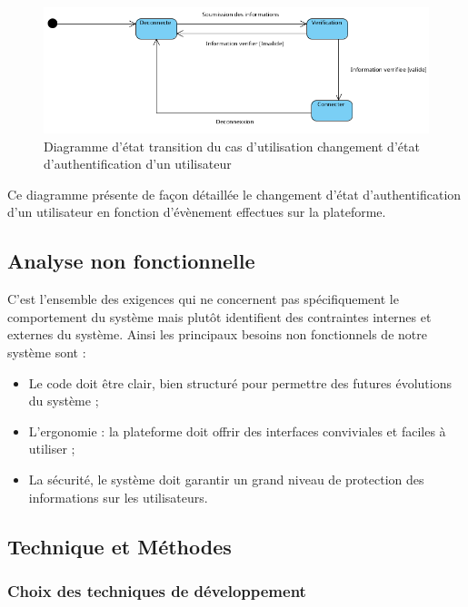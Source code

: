 \begin{itemize}
	      \begin{figure}[H]
		      \centering
		      \includegraphics[width=1\textwidth]{img/etu}
		      \caption{Diagramme d’état transition du cas d'utilisation changement d’état d'authentification d’un utilisateur}
		      \label{fig:mesh1}
	      \end{figure}

	      Ce diagramme présente de façon détaillée le changement d’état d’authentification d’un utilisateur en fonction d’évènement effectues sur la plateforme.
\end{itemize}

\subsection{Analyse non fonctionnelle} %

C’est l’ensemble des exigences qui ne concernent pas spécifiquement le comportement du système mais plutôt identifient des contraintes internes et externes du système. Ainsi les principaux besoins non fonctionnels de notre système sont :

\begin{itemize}
	\item Le code doit être clair, bien structuré pour permettre des futures évolutions du système ;
	\item L’ergonomie : la plateforme doit offrir des interfaces conviviales et faciles à utiliser ;
	\item La sécurité, le système doit garantir un grand niveau de protection des informations sur les utilisateurs.
\end{itemize}

\subsection{Technique et Méthodes} %

\subsubsection{Choix des techniques de développement}

